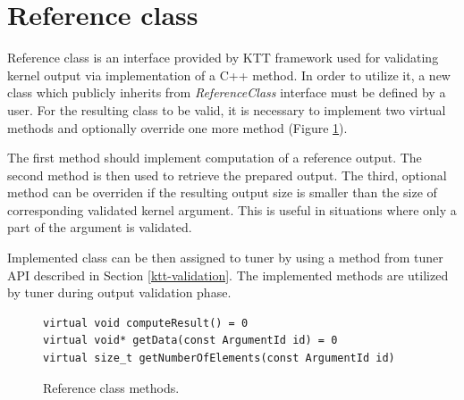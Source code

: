 \documentclass
[
    digital, %
    oneside, %
    table, %
    nolof, %
    nolot, %
    nocover %
]{fithesis3}
\begin{document}
\section{Reference class}
\label{ktt-reference-class}
Reference class is an interface provided by KTT framework used for validating kernel output via implementation of a C++ method. In order to utilize it,
a new class which publicly inherits from \textit{ReferenceClass} interface must be defined by a user. For the resulting class to be valid, it is
necessary to implement two virtual methods and optionally override one more method (Figure \ref{ktt-reference-methods}).

The first method should implement computation of a reference output. The second method is then used to retrieve the prepared output. The third, optional
method can be overriden if the resulting output size is smaller than the size of corresponding validated kernel argument. This is useful in situations
where only a part of the argument is validated.

Implemented class can be then assigned to tuner by using a method from tuner API described in Section \ref{ktt-validation}. The implemented
methods are utilized by tuner during output validation phase.

\begin{figure}[ht]
\begin{adjustwidth}{-1cm}{-1cm}
\begin{lstlisting}
virtual void computeResult() = 0
virtual void* getData(const ArgumentId id) = 0
virtual size_t getNumberOfElements(const ArgumentId id)
\end{lstlisting}
\caption{Reference class methods.}
\label{ktt-reference-methods}
\end{adjustwidth}
\end{figure}
\end{document}
